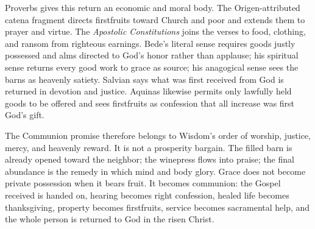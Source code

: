Proverbs gives this return an economic and moral body. The Origen-attributed
catena fragment directs firstfruits toward Church and poor and extends them to
prayer and virtue. The \emph{Apostolic Constitutions} joins the verses to food,
clothing, and ransom from righteous earnings. Bede's literal sense requires
goods justly possessed and alms directed to God's honor rather than applause;
his spiritual sense returns every good work to grace as source; his anagogical
sense sees the barns as heavenly satiety. Salvian says what was first received
from God is returned in devotion and justice. Aquinas likewise permits only
lawfully held goods to be offered and sees firstfruits as confession that all
increase was first God's gift.

The Communion promise therefore belongs to Wisdom's order of worship, justice,
mercy, and heavenly reward. It is not a prosperity bargain. The filled barn is
already opened toward the neighbor; the winepress flows into praise; the final
abundance is the remedy in which mind and body glory. Grace does not become
private possession when it bears fruit. It becomes communion: the Gospel
received is handed on, hearing becomes right confession, healed life becomes
thanksgiving, property becomes firstfruits, service becomes sacramental help,
and the whole person is returned to God in the risen Christ.
